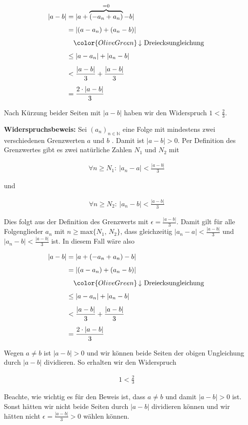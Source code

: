 \documentclass[fontsize=9pt,
               parskip=half-,
               DIV=14,
               listof=chapterentry,
               tocflat]{scrbook}
\begin{document}
\begin{solutionprocess*}
\begin{align*}
|a-b|&=|a+\overbrace {(-a_{n}+a_{n})} ^{=0}-b|\\[1ex]&=|(a-a_{n})+(a_{n}-b)|\\[1ex]&\quad {\color {OliveGreen}\left\downarrow \ {\text{Dreiecksungleichung}}\right.}\\[1ex]&\leq |a-a_{n}|+|a_{n}-b|\\[1ex]&<{\frac {|a-b|}{3}}+{\frac {|a-b|}{3}}\\[1ex]&={\frac {2\cdot |a-b|}{3}}
\end{align*}

Nach Kürzung beider Seiten mit $|a-b|$ haben wir den Widerspruch $1<{\tfrac {2}{3}}$.

\end{solutionprocess*}

\begin{proof*}
\textbf{Widerspruchsbeweis:} Sei $\left(a_{n}\right)_{n\in \mathbb {N} }$ eine Folge mit mindestens zwei verschiedenen Grenzwerten $a$ und $b$ . Damit ist $|a-b|>0$. Per Definition des Grenzwertes gibt es zwei natürliche Zahlen $N_{1}$ und $N_{2}$ mit

\begin{align*}
\forall n\geq N_{1}:\ |a_{n}-a|<{\frac {|a-b|}{3}}
\end{align*}

und

\begin{align*}
\forall n\geq N_{2}:\ |a_{n}-b|<{\frac {|a-b|}{3}}
\end{align*}

Dies folgt aus der Definition des Grenzwerts mit $\epsilon ={\tfrac {|a-b|}{3}}$. Damit gilt für alle Folgenglieder $a_{n}$ mit $n\geq \mathrm {max} \{N_{1},\,N_{2}\}$, dass gleichzeitig $|a_{n}-a|<{\tfrac {|a-b|}{3}}$ und $|a_{n}-b|<{\tfrac {|a-b|}{3}}$ ist. In diesem Fall wäre also

\begin{align*}
|a-b|&=|a+(-a_{n}+a_{n})-b|\\[1ex]&=|(a-a_{n})+(a_{n}-b)|\\[1ex]&\quad {\color {OliveGreen}\left\downarrow \ {\text{Dreiecksungleichung}}\right.}\\[1ex]&\leq |a-a_{n}|+|a_{n}-b|\\[1ex]&<{\frac {|a-b|}{3}}+{\frac {|a-b|}{3}}\\[1ex]&={\frac {2\cdot |a-b|}{3}}
\end{align*}

Wegen $a\neq b$ ist $|a-b|>0$ und wir können beide Seiten der obigen Ungleichung durch $|a-b|$ dividieren. So erhalten wir den Widerspruch

\begin{align*}
1<{\frac {2}{3}}
\end{align*}

Beachte, wie wichtig es für den Beweis ist, dass $a\neq b$ und damit $|a-b|>0$ ist. Sonst hätten wir nicht beide Seiten durch $|a-b|$ dividieren können und wir hätten nicht $\epsilon ={\tfrac {|a-b|}{3}}>0$ wählen können.

\end{proof*}
\end{document}
